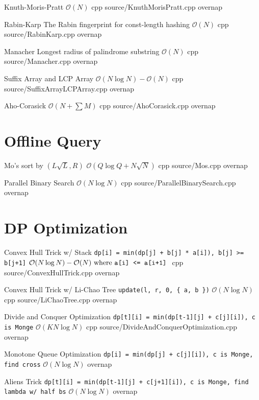 \documentclass[landscape, 10pt, a4paper, oneside, twocolumn]{extarticle}
\begin{document}
\Algorithm
{Knuth-Moris-Pratt}
{}
{$\mathcal{O}(N)$}
{cpp}
{source/KnuthMorisPratt.cpp}
{overnap}

\Algorithm
{Rabin-Karp}
{The Rabin fingerprint for const-length hashing}
{$\mathcal{O}(N)$}
{cpp}
{source/RabinKarp.cpp}
{overnap}

\Algorithm
{Manacher}
{Longest radius of palindrome substring}
{$\mathcal{O}(N)$}
{cpp}
{source/Manacher.cpp}
{overnap}

\Algorithm
{Suffix Array and LCP Array}
{}
{$\mathcal{O}(N\log{N})-\mathcal{O}(N)$}
{cpp}
{source/SuffixArrayLCPArray.cpp}
{overnap}

\Algorithm
{Aho-Corasick}
{}
{$\mathcal{O}(N+\sum{M})$}
{cpp}
{source/AhoCorasick.cpp}
{overnap}


\section{Offline Query}

\Algorithm
{Mo's}
{sort by $(L\sqrt{L}, R)$}
{$\mathcal{O}(Q\log{Q}+N\sqrt{N})$}
{cpp}
{source/Mos.cpp}
{overnap}

\Algorithm
{Parallel Binary Search}
{}
{$\mathcal{O}(N\log{N})$}
{cpp}
{source/ParallelBinarySearch.cpp}
{overnap}


\section{DP Optimization}

\Algorithm
{Convex Hull Trick w/ Stack}
{\texttt{dp[i] = min(dp[j] + b[j] * a[i]), b[j] >= b[j+1]}}
{$\mathcal{O}(N\log{N})-\mathcal{O}(N)\text{ where \texttt{a[i] <= a[i+1]} }$}
{cpp}
{source/ConvexHullTrick.cpp}
{overnap}

\Algorithm
{Convex Hull Trick w/ Li-Chao Tree}
{\texttt{update(l, r, 0, \{ a, b \})}}
{$\mathcal{O}(N\log{N})$}
{cpp}
{source/LiChaoTree.cpp}
{overnap}

\Algorithm
{Divide and Conquer Optimization}
{\texttt{dp[t][i] = min(dp[t-1][j] + c[j][i]), c is Monge}}
{$\mathcal{O}(KN\log{N})$}
{cpp}
{source/DivideAndConquerOptimization.cpp}
{overnap}

\Algorithm
{Monotone Queue Optimization}
{\texttt{dp[i] = min(dp[j] + c[j][i]), c is Monge, find cross}}
{$\mathcal{O}(N\log{N})$}
{}
{}
{overnap}

\Algorithm
{Aliens Trick}
{\texttt{dp[t][i] = min(dp[t-1][j] + c[j+1][i]), c is Monge, find lambda w/ half bs}}
{$\mathcal{O}(N\log{N})$}
{}
{}
{overnap}
\end{document}
